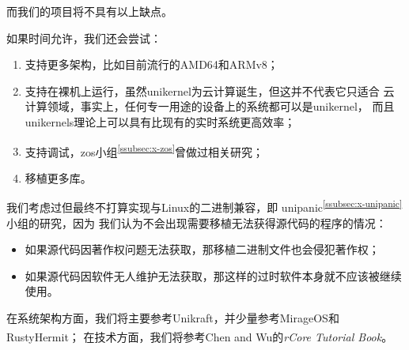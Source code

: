 \documentclass[UTF8,fontset=none,linespread=1.15]{ctexart}
\let\nosupcite\cite
\renewcommand*{\cite}[1]{\textsuperscript{\nosupcite{#1}}}
\begin{document}
而我们的项目将不具有以上缺点。

如果时间允许，我们还会尝试：
\begin{enumerate}
\item 支持更多架构，比如目前流行的AMD64和ARMv8；
\item 支持在裸机上运行，虽然unikernel为云计算诞生，但这并不代表它只适合
    云计算领域，事实上，任何专一用途的设备上的系统都可以是unikernel，
    而且unikernels理论上可以具有比现有的实时系统更高效率；
\item 支持调试，zos小组\textsuperscript{\ref{ssubsec:x-zos}}曾做过相关研究；
\item 移植更多库。
\end{enumerate}

我们考虑过但最终不打算实现与Linux的二进制兼容，即
unipanic\textsuperscript{\ref{ssubsec:x-unipanic}}小组的研究，因为
我们认为不会出现需要移植无法获得源代码的程序的情况：
\begin{itemize}
\item 如果源代码因著作权问题无法获取，那移植二进制文件也会侵犯著作权；
\item 如果源代码因软件无人维护无法获取，那这样的过时软件本身就不应该被继续使用。
\end{itemize}

在系统架构方面，我们将主要参考Unikraft，并少量参考MirageOS和RustyHermit；
在技术方面，我们将参考Chen and Wu的\textit{rCore Tutorial Book}\cite{bib:rcore-os}。
\end{document}

